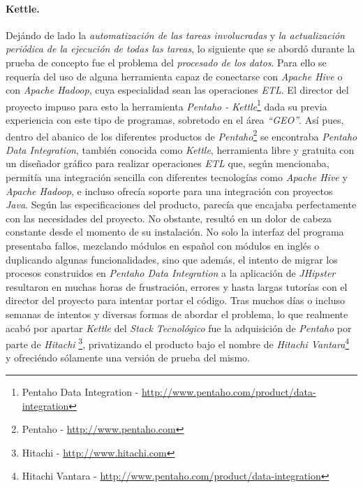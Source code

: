 \par
\paragraph*{Kettle.}

\par
Dejándo de lado la \textit{automatización de las tareas involucradas} y \textit{la actualización periódica de la ejecución de todas las tareas}, lo siguiente que se abordó durante la prueba de concepto fue el problema del \textit{procesado de los datos}. Para ello se requería del uso de alguna herramienta capaz de conectarse con \textit{Apache Hive} o con \textit{Apache Hadoop}, cuya especialidad sean las operaciones \textit{ETL}. El director del proyecto impuso para esto la herramienta \textit{Pentaho - Kettle}\footnote{Pentaho Data Integration - \url{http://www.pentaho.com/product/data-integration}} dada su previa experiencia con este tipo de programas, sobretodo en el área \textit{``GEO''}. Así pues, dentro del abanico de los diferentes productos de \textit{Pentaho}\footnote{Pentaho - \url{http://www.pentaho.com}} se encontraba \textit{Pentaho Data Integration}, también conocida como \textit{Kettle}, herramienta libre y gratuita con un diseñador gráfico para realizar operaciones \textit{ETL} que, según mencionaba, permitía una integración sencilla con diferentes tecnologías como \textit{Apache Hive} y \textit{Apache Hadoop}, e incluso ofrecía soporte para una integración con proyectos \textit{Java}. Según las especificaciones del producto, parecía que encajaba perfectamente con las necesidades del proyecto. No obstante, resultó en un dolor de cabeza constante desde el momento de su instalación. No solo la interfaz del programa presentaba fallos, mezclando módulos en español con módulos en inglés o duplicando algunas funcionalidades, sino que además, el intento de migrar los procesos construidos en \textit{Pentaho Data Integration} a la aplicación de \textit{JHipster} resultaron en muchas horas de frustración, errores y hasta largas tutorías con el director del proyecto para intentar portar el código. Tras muchos días o incluso semanas de intentos y diversas formas de abordar el problema, lo que realmente acabó por apartar \textit{Kettle} del \textit{Stack Tecnológico} fue la adquisición de \textit{Pentaho} por parte de \textit{Hitachi} \footnote{Hitachi - \url{http://www.hitachi.com}}, privatizando el producto bajo el nombre de \textit{Hitachi Vantara}\footnote{Hitachi Vantara - \url{http://www.pentaho.com/product/data-integration}} y ofreciéndo sólamente una versión de prueba del mismo. 


